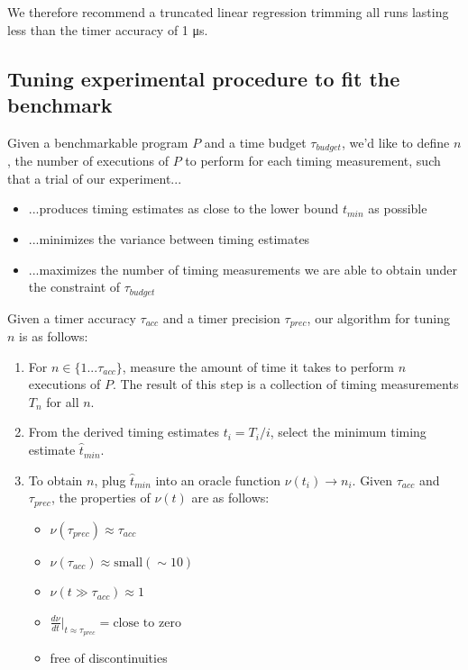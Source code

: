 \documentclass[conference]{IEEEtran}
\begin{document}
We therefore recommend a truncated linear regression trimming all runs lasting less than the timer accuracy of 1 μs.


\subsection{Tuning experimental procedure to fit the benchmark}

Given a benchmarkable program $P$ and a time budget $\tau_{budget}$, we'd like to define $n$, the number of executions of $P$ to perform for each timing measurement, such that a trial of our experiment...

\begin{itemize}
    \item ...produces timing estimates as close to the lower bound $t_{min}$ as possible
    \item ...minimizes the variance between timing estimates
    \item ...maximizes the number of timing measurements we are able to obtain under the constraint of $\tau_{budget}$
\end{itemize}

Given a timer accuracy $\tau_{acc}$ and a timer precision $\tau_{prec}$, our algorithm for tuning $n$ is as follows:

\begin{enumerate}
\item For $n \in \{1...\tau_{acc}\}$, measure the amount of time it takes to perform $n$ executions of $P$. The result of this step is a collection of timing measurements $T_n$ for all $n$.
\item From the derived timing estimates $t_i = T_i / i$, select the minimum timing estimate $\hat{t}_{min}$.
\item To obtain $n$, plug $\hat{t}_{min}$ into an oracle function $\nu(t_i) \to n_i$. Given $\tau_{acc}$ and $\tau_{prec}$, the properties of $\nu(t)$ are as follows:
\begin{itemize}
    \item $\nu(\tau_{prec}) \approx \tau_{acc}$
    \item $\nu(\tau_{acc}) \approx \text{small} (\sim 10)$
    \item $\nu(t \gg \tau_{acc}) \approx 1$
    \item $\frac{d\nu}{dt}\big|_{t \approx \tau_{prec}} = \text{close to zero}$
    \item free of discontinuities 
\end{itemize}
\end{enumerate}
\end{document}
